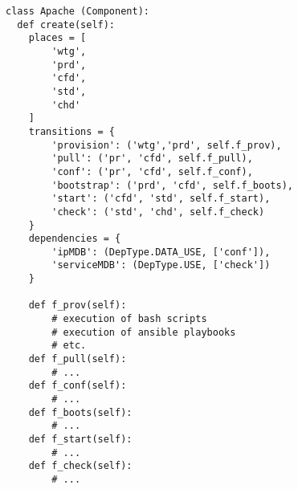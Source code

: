\begin{lstlisting}[label=codeapache,caption=Madeus code of the Apache
  component type.]
class Apache (Component):
  def create(self):
    places = [
        'wtg',
        'prd',
        'cfd',
        'std',
        'chd'
    ]
    transitions = {
        'provision': ('wtg','prd', self.f_prov),
        'pull': ('pr', 'cfd', self.f_pull),
        'conf': ('pr', 'cfd', self.f_conf),
        'bootstrap': ('prd', 'cfd', self.f_boots),
        'start': ('cfd', 'std', self.f_start),
        'check': ('std', 'chd', self.f_check)
    }
    dependencies = {
        'ipMDB': (DepType.DATA_USE, ['conf']),
        'serviceMDB': (DepType.USE, ['check'])
    }

    def f_prov(self):
        # execution of bash scripts
        # execution of ansible playbooks
        # etc.
    def f_pull(self):
        # ...
    def f_conf(self):
        # ...
    def f_boots(self):
        # ...
    def f_start(self):
        # ...
    def f_check(self):
        # ...
\end{lstlisting}
